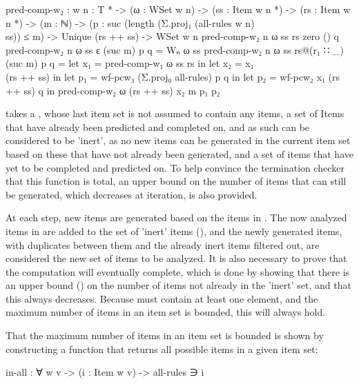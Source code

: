 		\begin{code}
			
			pred-comp-w₂ : {w n : T *} ->
			  (ω : WSet w n) ->
			  (ss : Item w n *) ->
			  (rs : Item w n *) ->
			  (m : ℕ) ->
			  (p : suc (length (Σ.proj₁ (all-rules {w} {n}) \\ ss)) ≤ m) ->
			  Unique (rs ++ ss) ->
			  WSet w n
			pred-comp-w₂ {n} ω ss rs zero () q
			pred-comp-w₂ {n} ω ss ε (suc m) p q = Wₙ ω ss
			pred-comp-w₂ {n} ω ss rs@(r₁ ∷ _) (suc m) p q =
			  let x₁ = pred-comp-w₁ ω ss rs in
			  let x₂ = x₁ \\ (rs ++ ss) in
			  let p₁ = wf-pcw₃ (Σ.proj₀ all-rules) p q in
			  let p₂ = wf-pcw₂ x₁ (rs ++ ss) q in
			  pred-comp-w₂ ω (rs ++ ss) x₂ m p₁ p₂
		
		\end{code}

		 takes a , whose last item set is not
		assumed to contain any items, a set of Items that have already been
		predicted and completed on, and as such can be considered to be
		'inert', as no new items can be generated in the current item set based
		on these that have not already been generated, and a set of items that
		have yet to be completed and predicted on. To help convince the
		termination checker that this function is total, an upper bound on the
		number of items that can still be generated, which decreases at
		iteration, is also provided.

		At each step, new items are generated based on the items in
		. The now analyzed items in  are added to the set
		of 'inert' items (), and the newly generated items, with
		duplicates between them and the already inert items filtered out, are
		considered the new set of items to be analyzed. It is also necessary to
		prove that the computation will eventually complete, which is done by
		showing that there is an upper bound () on the number of items not already in the
		'inert' set, and that this always decreases. Because  must
		contain at least one element, and the maximum number of items in an 
		item set is bounded, this will always hold.
		
		That the maximum number of items in an item set is bounded is shown by 
		constructing a function that returns all possible items in a given item 
		set:
		
		\begin{code}

			in-all : ∀ {w v} -> (i : Item w v) -> all-rules ∋ i
		
		\end{code}

